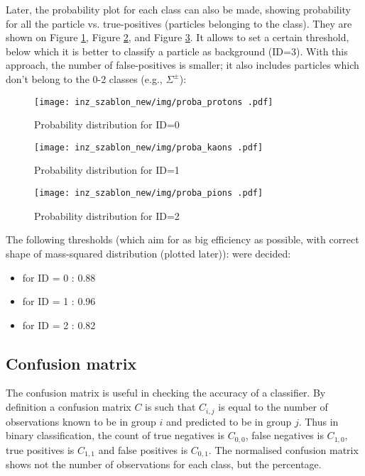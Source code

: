 Later, the probability plot for each class can also be made, showing probability for all the particle vs. true-positives (particles belonging to the class). They are shown on Figure \ref{proba id0}, Figure \ref{proba id1}, and Figure \ref{proba id2}. It allows to set a certain threshold, below which it is better to classify a particle as background (ID=3). With this approach, the number of false-positives is smaller; it also includes particles which don't belong to the 0-2 classes (e.g., $\Sigma^\pm$):
\begin{figure}[H]
    \centering
    \texttt{[image: inz\_szablon\_new/img/proba\_protons .pdf]}
    \caption{Probability distribution for ID=0 }
    \label{proba id0}
\end{figure}
\begin{figure}[H]
    \centering
    \texttt{[image: inz\_szablon\_new/img/proba\_kaons .pdf]}
    \caption{Probability distribution for ID=1}
    \label{proba id1}
\end{figure}
\begin{figure}[H]
    \centering
    \texttt{[image: inz\_szablon\_new/img/proba\_pions .pdf]}
    \caption{Probability distribution for ID=2 }
    \label{proba id2}
\end{figure}
The following thresholds (which aim for as big efficiency as possible, with correct shape of mass-squared distribution (plotted later)): were decided:
\begin{itemize}
    \item for ID = 0 : 0.88
    \item for ID = 1 : 0.96
    \item for ID = 2 : 0.82
\end{itemize}
\clearpage
\subsection{Confusion matrix}
The confusion matrix is useful in checking the accuracy of a classifier. By definition a confusion matrix $C$ is such that $C_{i, j}$ is equal to the number of observations known to be in group $i$ and predicted to be in group $j$. Thus in binary classification, the count of true negatives is $C_{0, 0}$, false negatives is $C_{1, 0}$, true positives is $C_{1, 1}$  and false positives is $C_{0, 1}$\cite{cmatrix}. The normalised confusion matrix shows not the number of observations for each class, but the percentage.

